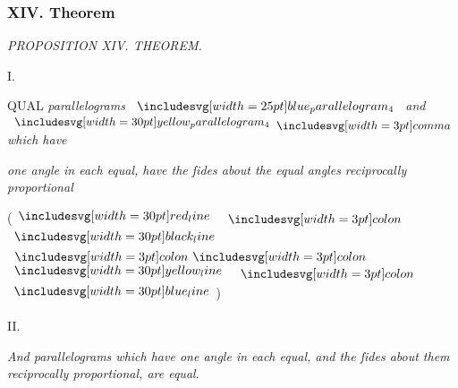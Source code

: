 \documentclass[11pt,preview]{standalone}
\begin{document}
\subsubsection{XIV. Theorem}

\begin{minipage}[t]{0.43\textwidth}
    \vspace{15pt}
    
\end{minipage}%
\hfill
\begin{minipage}[t]{0.54\textwidth}
    \begin{center}
        \textit{PROPOSITION XIV. THEOREM.}\label{book6pr14} \\
    \end{center}

    \hfill

    \begin{center}
        I.\\
        \raggedright \lettrine[lines=3, loversize=1, nindent=0pt]{}{}QUAL \textit{parallelograms} $\img{blue_parallelogram_4}$ \textit{and} $\img[0][0][30]{yellow_parallelogram_4} \bcomma$ \textit{which have}
    \end{center}
    \raggedright \textit{one angle in each equal, have the ſides about the equal angles reciprocally proportional}
\end{minipage}
\begin{flushright}
    (\hspace{-1ex}$\redline$ $\bcolon$ $\blackline$ $\bbcolon$ $\yellowline$ $\bcolon$ $\blueline$\hspace{-1ex})%
\end{flushright}
\begin{minipage}[t]{0.43\textwidth}
    \phantom{}
\end{minipage}%
\begin{minipage}[t]{0.54\textwidth}
    \begin{center}
        II.\\
        \vspace{1ex}
        \raggedright \textit{And parallelograms which have one angle in each equal, and the ſides about them reciprocally proportional, are equal}.
    \end{center}
\end{minipage}
\end{document}
